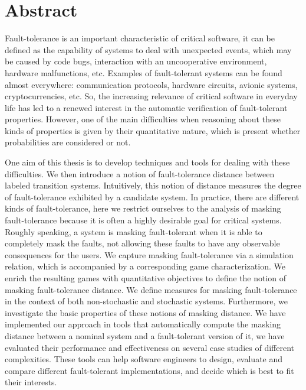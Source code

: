 \chapter*{Abstract}

Fault-tolerance is an important characteristic of critical software, it can be defined as the capability of systems to deal with unexpected events, which may be caused by code bugs, interaction with an uncooperative environment, 
hardware malfunctions, etc.
Examples of fault-tolerant systems can be found  almost everywhere:
communication protocols, hardware circuits, avionic systems, 
cryptocurrencies, etc. 
So, the increasing relevance of critical software in  
everyday life  has led to a renewed interest  in the automatic verification of fault-tolerant properties. However, one of the main difficulties when reasoning about these kinds of properties is given by their quantitative nature, which is present whether probabilities are considered or not.

One aim of this thesis is to develop techniques and tools for dealing with these difficulties.
We then introduce a notion of fault-tolerance distance between labeled transition systems. Intuitively, this notion of distance measures the degree of fault-tolerance exhibited by a candidate system.
In practice, there are different kinds of fault-tolerance, here we restrict ourselves to the analysis of masking fault-tolerance because it is often a highly desirable goal for critical systems. 
Roughly speaking, a system is masking fault-tolerant when it is able to completely mask the faults, not allowing these faults to have any observable consequences for the users.  
We capture masking fault-tolerance via a simulation relation, which is accompanied  by a corresponding  game characterization. 
We enrich the resulting games with quantitative objectives to 
define the notion of masking fault-tolerance distance.
We define measures for masking fault-tolerance in the context of both non-stochastic and stochastic systems. Furthermore, we investigate the basic properties of these notions of masking distance.
We have implemented our approach in tools that automatically compute the masking distance between a nominal system and a fault-tolerant version of it, we have evaluated their performance and effectiveness on several case studies of different complexities.
These tools can help software engineers to design, evaluate and compare different fault-tolerant implementations, and decide which is best to fit their interests.

